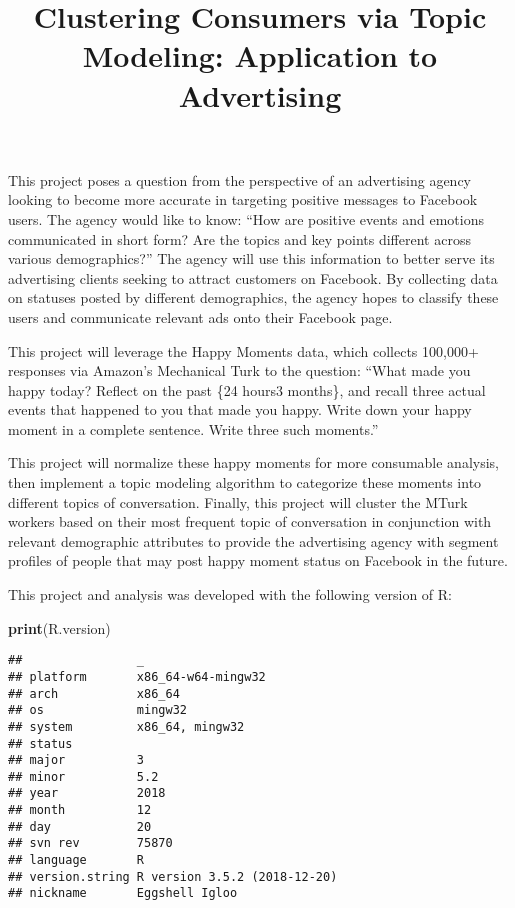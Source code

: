 \documentclass[]{article}
\title{Clustering Consumers via Topic Modeling: Application to Advertising}
\author{}
\date{}
\newenvironment{Shaded}{\begin{snugshade}}{\end{snugshade}}
\newcommand{\KeywordTok}[1]{\textcolor[rgb]{0.13,0.29,0.53}{\textbf{#1}}}
\newcommand{\NormalTok}[1]{#1}
\begin{document}
\maketitle

This project poses a question from the perspective of an advertising
agency looking to become more accurate in targeting positive messages to
Facebook users. The agency would like to know: ``How are positive events
and emotions communicated in short form? Are the topics and key points
different across various demographics?'' The agency will use this
information to better serve its advertising clients seeking to attract
customers on Facebook. By collecting data on statuses posted by
different demographics, the agency hopes to classify these users and
communicate relevant ads onto their Facebook page.

This project will leverage the Happy Moments data, which collects
100,000+ responses via Amazon's Mechanical Turk to the question: ``What
made you happy today? Reflect on the past \{24 hours\textbar{}3
months\}, and recall three actual events that happened to you that made
you happy. Write down your happy moment in a complete sentence. Write
three such moments.''

This project will normalize these happy moments for more consumable
analysis, then implement a topic modeling algorithm to categorize these
moments into different topics of conversation. Finally, this project
will cluster the MTurk workers based on their most frequent topic of
conversation in conjunction with relevant demographic attributes to
provide the advertising agency with segment profiles of people that may
post happy moment status on Facebook in the future.

This project and analysis was developed with the following version of R:

\begin{Shaded}
\begin{Highlighting}[]
\KeywordTok{print}\NormalTok{(R.version)}
\end{Highlighting}
\end{Shaded}

\begin{verbatim}
##                _                           
## platform       x86_64-w64-mingw32          
## arch           x86_64                      
## os             mingw32                     
## system         x86_64, mingw32             
## status                                     
## major          3                           
## minor          5.2                         
## year           2018                        
## month          12                          
## day            20                          
## svn rev        75870                       
## language       R                           
## version.string R version 3.5.2 (2018-12-20)
## nickname       Eggshell Igloo
\end{verbatim}
\end{document}
